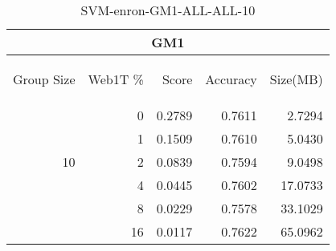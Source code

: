 \begin{center}
\begin{table}[htbp] 
 \begin{center}
\begin{tabular}{ | r | r | r | r | r |}
\hline
\multicolumn{5}{|c|}{GM1}\\
\hline
\begin{sideways}Group Size\end{sideways} & \begin{sideways}Web1T \%\end{sideways} & \begin{sideways}Score\end{sideways} & \begin{sideways}Accuracy\end{sideways} & \begin{sideways}Size(MB)\end{sideways}\\
\hline
\multirow{5}{*}{10}
 & 0 & 0.2789 & 0.7611 & 2.7294\\ \cline{2-5}
 & 1 & 0.1509 & 0.7610 & 5.0430\\ \cline{2-5}
 & 2 & 0.0839 & 0.7594 & 9.0498\\ \cline{2-5}
 & 4 & 0.0445 & 0.7602 & 17.0733\\ \cline{2-5}
 & 8 & 0.0229 & 0.7578 & 33.1029\\ \cline{2-5}
 & 16 & 0.0117 & 0.7622 & 65.0962\\ \cline{2-5}
\hline
\end{tabular}
\caption{SVM-enron-GM1-ALL-ALL-10}
\label{table:SVM-enron-GM1-ALL-ALL-10}
\end{center}
 \end{table}
\end{center}

